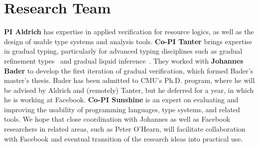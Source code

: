 \documentclass[10pt,twocolumn]{article}
\begin{document}
\begin{sloppypar}
\section{Research Team}
\vspace{-2ex}

\textbf{PI Aldrich} has expertise in applied verification for resource logics, as well as the design of usable type systems and analysis tools.  \textbf{Co-PI Tanter} brings expertise in gradual typing, particularly for advanced typing disciplines such as gradual refinement types~\cite{lehmannTanter:popl2017} and gradual liquid inference~\cite{vazouAl:oopsla2018}.  They worked with \textbf{Johannes Bader} to develop the first iteration of gradual verification, which formed Bader's master's thesis.  Bader has been admitted to CMU's Ph.D. program, where he will be advised by Aldrich and (remotely) Tanter, but he deferred for a year, in which he is working at Facebook.  \textbf{Co-PI Sunshine} is an expert on evaluating and improving the usability of programming languages, type systems, and related tools.  We hope that close coordination with Johannes as well as Facebook researchers in related areas, such as Peter O'Hearn, will facilitate collaboration with Facebook and eventual transition of the research ideas into practical use.




\end{sloppypar}
\end{document}
